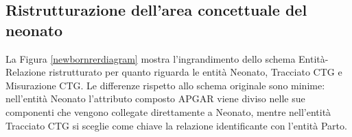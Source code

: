 \subsection{Ristrutturazione dell'area concettuale del neonato}

La Figura \ref{newbornrerdiagram} mostra l'ingrandimento dello schema Entità-Relazione ristrutturato per quanto riguarda le entità Neonato, Tracciato CTG e Misurazione CTG.
Le differenze rispetto allo schema originale sono minime: nell'entità Neonato l'attributo composto APGAR viene diviso nelle sue componenti che vengono collegate direttamente a Neonato, mentre nell'entità Tracciato CTG si sceglie come chiave la relazione identificante con l'entità Parto.

\begin{sidewaysfigure}
    \centering
    
    \caption{Schema Entità-Relazione ristrutturato. Visione d'insieme semplificata, contenente soltanto entità e relazioni del modello. Le aree tratteggiate delimitano gli stessi ingrandimenti dello schema concettuale originale.}
    \label{completererdiagram}
\end{sidewaysfigure}

\begin{sidewaysfigure}
    \centering
    
    \caption{Schema Entità-Relazione ristrutturato. Ingrandimento dell'area gravidanza.}
\label{pregnancyrerdiagram}
\end{sidewaysfigure}

\begin{sidewaysfigure}
    \centering
    
    \caption{Schema Entità-Relazione ristrutturato. Ingrandimento dell'area visite.}
\label{visitsrerdiagram}
\end{sidewaysfigure}

\begin{sidewaysfigure}
    \centering
    
    \caption{Schema Entità-Relazione ristrutturato. Ingrandimento dell'area parto.}
\label{deliveryrerdiagram}
\end{sidewaysfigure}

\begin{sidewaysfigure}
    \centering
    
    \caption{Schema Entità-Relazione ristrutturato. Ingrandimento dell'area neonato.}
\label{newbornrerdiagram}
\end{sidewaysfigure}

